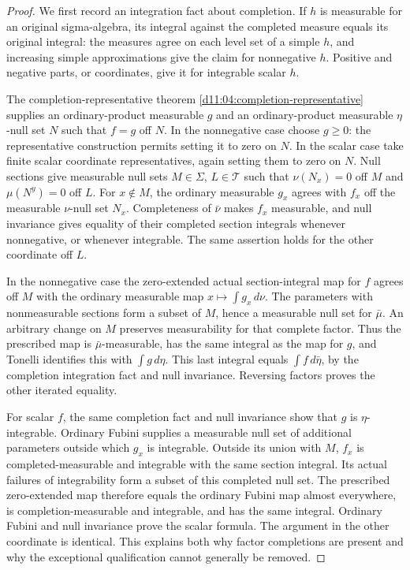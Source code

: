\documentclass[11pt,oneside,openany]{book}
\theoremstyle{definition}
\theoremstyle{remark}
\begin{document}
\begin{proof}
We first record an integration fact about completion. If $h$ is
measurable for an original sigma-algebra, its integral against the
completed measure equals its original integral: the measures agree on
each level set of a simple $h$, and increasing simple approximations
give the claim for nonnegative $h$. Positive and negative parts, or
coordinates, give it for integrable scalar $h$.

The completion-representative theorem
\cref{d11:04:completion-representative} supplies an ordinary-product
measurable $g$ and an ordinary-product measurable $\eta$-null set $N$
such that $f=g$ off $N$. In the nonnegative case choose $g\geq0$:
the representative construction permits setting it to zero on $N$.
In the scalar case take finite scalar coordinate representatives, again
setting them to zero on $N$. Null sections give measurable null sets
$M\in\Sigma$, $L\in\mathcal T$ such that
$\nu(N_x)=0$ off $M$ and $\mu(N^y)=0$ off $L$.
For $x\notin M$, the ordinary measurable $g_x$ agrees with $f_x$ off
the measurable $\nu$-null set $N_x$. Completeness of $\bar\nu$ makes
$f_x$ measurable, and null invariance gives equality of their completed
section integrals whenever nonnegative, or whenever integrable.
The same assertion holds for the other coordinate off $L$.

In the nonnegative case the zero-extended actual section-integral map
for $f$ agrees off $M$ with the ordinary measurable map
$x\mapsto\int g_x\,d\nu$. The parameters with nonmeasurable sections
form a subset of $M$, hence a measurable null set for $\bar\mu$.
An arbitrary change on $M$ preserves measurability for that complete
factor. Thus the prescribed map is $\bar\mu$-measurable, has the same
integral as the map for $g$, and Tonelli identifies this with
$\int g\,d\eta$. This last integral equals $\int f\,d\bar\eta$, by
the completion integration fact and null invariance. Reversing factors
proves the other iterated equality.

For scalar $f$, the same completion fact and null invariance show that
$g$ is $\eta$-integrable. Ordinary Fubini supplies a measurable null set
of additional parameters outside which $g_x$ is integrable. Outside
its union with $M$, $f_x$ is completed-measurable and integrable with
the same section integral. Its actual failures of integrability form a
subset of this completed null set. The prescribed zero-extended map
therefore equals the ordinary Fubini map almost everywhere, is
completion-measurable and integrable, and has the same integral.
Ordinary Fubini and null invariance prove the scalar formula. The
argument in the other coordinate is identical. This explains both why
factor completions are present and why the exceptional qualification
cannot generally be removed.
\end{proof}
\end{document}
